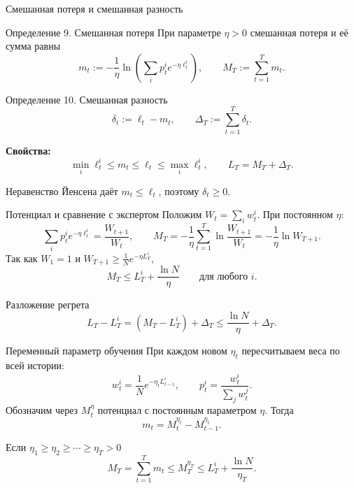 \documentclass[11pt,aspectratio=169]{beamer}
\begin{document}
\begin{frame}{Смешанная потеря и смешанная разность}
  \begin{block}{Определение 9. Смешанная потеря}
    При параметре $\eta>0$ смешанная потеря и её сумма равны
    \[
      m_t:=-\frac1\eta\ln\!\left(\sum_i p_t^i e^{-\eta\ell_t^i}\right),
      \qquad M_T:=\sum_{t=1}^T m_t.
    \]
  \end{block}
  \begin{block}{Определение 10. Смешанная разность}
    \[\delta_t:=\ell_t-m_t,\qquad \Delta_T:=\sum_{t=1}^T\delta_t.\]
  \end{block}
  \textbf{Свойства:}
  \[\min_i\ell_t^i\le m_t\le\ell_t\le\max_i\ell_t^i,\qquad L_T=M_T+\Delta_T.\]
  \par\vfill{\scriptsize Неравенство Йенсена даёт $m_t\le\ell_t$, поэтому $\delta_t\ge0$.\par}
\end{frame}
\begin{frame}{Потенциал и сравнение с экспертом}
  Положим $W_t=\sum_i w_t^i$. При постоянном $\eta$:
  \[
    \sum_i p_t^i e^{-\eta\ell_t^i}=\frac{W_{t+1}}{W_t},\qquad
    M_T=-\frac1\eta\sum_{t=1}^T\ln\frac{W_{t+1}}{W_t}=-\frac1\eta\ln W_{T+1}.
  \]
  Так как $W_1=1$ и $W_{T+1}\ge\frac1N e^{-\eta L_T^i}$,
  \[M_T\le L_T^i+\frac{\ln N}{\eta}\qquad\text{для любого }i.\]
  \begin{block}{Разложение регрета}
    \[L_T-L_T^i=(M_T-L_T^i)+\Delta_T\le\frac{\ln N}{\eta}+\Delta_T.\]
  \end{block}
\end{frame}
\begin{frame}{Переменный параметр обучения}
  При каждом новом $\eta_t$ пересчитываем веса по всей истории:
  \[w_t^i=\frac1N e^{-\eta_t L_{t-1}^i},\qquad p_t^i=\frac{w_t^i}{\sum_j w_t^j}.\]
  Обозначим через $M_t^\eta$ потенциал с постоянным параметром $\eta$.
  Тогда
  \[m_t=M_t^{\eta_t}-M_{t-1}^{\eta_t}.\]
  \begin{block}{Если $\eta_1\ge\eta_2\ge\cdots\ge\eta_T>0$}
    \[M_T=\sum_{t=1}^T m_t\le M_T^{\eta_T}\le L_T^i+\frac{\ln N}{\eta_T}.\]
  \end{block}
\end{frame}

\end{document}
